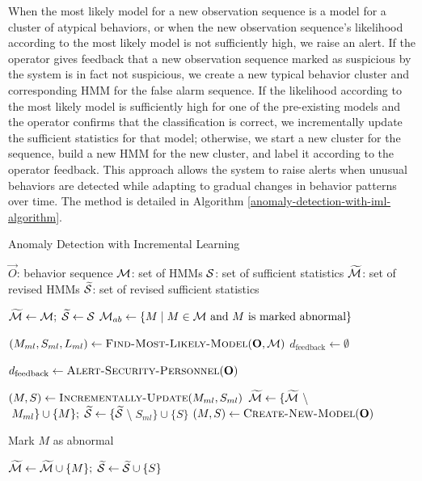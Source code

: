 When the most likely model for a new observation sequence is a model
for a cluster of atypical behaviors, or when the new observation
sequence's likelihood according to the most likely model is not
sufficiently high, we raise an alert. If the operator gives feedback
that a new observation sequence marked as suspicious by the system is
in fact not suspicious, we create a new typical behavior cluster and
corresponding HMM for the false alarm sequence. If the likelihood
according to the most likely model is sufficiently high for one of the
pre-existing models and the operator confirms that the classification
is correct, we incrementally update the sufficient statistics for that
model; otherwise, we start a new cluster for the sequence, build a new
HMM for the new cluster, and label it according to the operator
feedback. This approach allows the system to raise alerts when unusual
behaviors are detected while adapting to gradual changes in behavior
patterns over time. The method is detailed in Algorithm
\ref{anomaly-detection-with-iml-algorithm}.

\begin{algorithm}
  \caption{Anomaly Detection with Incremental Learning}
  \label{anomaly-detection-with-iml-algorithm}
  \begin{algorithmic}
    \REQUIRE $\vec{O}$: behavior sequence 
    \REQUIRE ${\cal M}$: set of HMMs 
    \REQUIRE ${\cal S}$: set of sufficient statistics 
    \ENSURE $\widetilde{\cal M}$: set of revised HMMs 
    \ENSURE $\widetilde{\cal S}$: set of revised sufficient statistics
	
    \STATE $\widetilde{\cal M} \gets {\cal M}; \; \widetilde{\cal S} \gets {\cal S}$
    \STATE ${\cal M}_{ab} \gets \{ M \mid M \in {\cal M} \text{~and $M$ is marked abnormal} \}$ 
		
    \STATE $( M_{ml}, S_{ml}, L_{ml} ) \gets
    \textsc{Find-Most-Likely-Model}(\vec{O}, {\cal M})$ 
    \STATE $d_{\text{feedback}} \gets \emptyset$
		
      \STATE $d_{\text{feedback}} \gets \textsc{Alert-Security-Personnel}(\vec{O})$
    \ENDIF

      \STATE $( M, S ) \gets \textsc{Incrementally-Update}(M_{ml}, S_{ml})$ 
      \STATE $\widetilde{\cal M} \gets \{ \widetilde{\cal
      M}\;$\textbackslash$\;M_{ml} \} \cup \{ M \}; \; \widetilde{\cal S} \gets \{ \widetilde{\cal
      S}\;$\textbackslash$\;S_{ml} \} \cup \{ S \}$ 
    \ELSE 
      \STATE $( M, S ) \gets \textsc{Create-New-Model}(\vec{O})$

        \STATE Mark $M$ as abnormal 
      \ENDIF

      \STATE $\widetilde{\cal M} \gets \widetilde{\cal M} \cup \{ M \}; \; \widetilde{\cal S} \gets \widetilde{\cal S} \cup \{ S \}$ 
    \ENDIF
  \end{algorithmic}
\end{algorithm}

